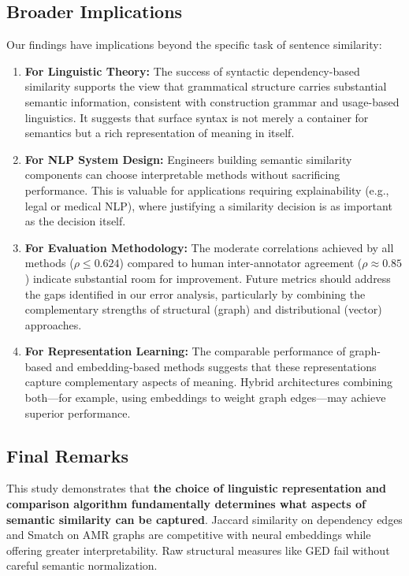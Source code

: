\documentclass[11pt,a4paper]{article}
\begin{document}
\subsection{Broader Implications}

Our findings have implications beyond the specific task of sentence similarity:

\begin{enumerate}
    \item \textbf{For Linguistic Theory:} The success of syntactic dependency-based similarity supports the view that grammatical structure carries substantial semantic information, consistent with construction grammar and usage-based linguistics. It suggests that surface syntax is not merely a container for semantics but a rich representation of meaning in itself.
    
    \item \textbf{For NLP System Design:} Engineers building semantic similarity components can choose interpretable methods without sacrificing performance. This is valuable for applications requiring explainability (e.g., legal or medical NLP), where justifying a similarity decision is as important as the decision itself.
    
    \item \textbf{For Evaluation Methodology:} The moderate correlations achieved by all methods ($\rho \leq 0.624$) compared to human inter-annotator agreement ($\rho \approx 0.85$) indicate substantial room for improvement. Future metrics should address the gaps identified in our error analysis, particularly by combining the complementary strengths of structural (graph) and distributional (vector) approaches.
    
    \item \textbf{For Representation Learning:} The comparable performance of graph-based and embedding-based methods suggests that these representations capture complementary aspects of meaning. Hybrid architectures combining both---for example, using embeddings to weight graph edges---may achieve superior performance.
\end{enumerate}

\subsection{Final Remarks}

This study demonstrates that \textbf{the choice of linguistic representation and comparison algorithm fundamentally determines what aspects of semantic similarity can be captured}. Jaccard similarity on dependency edges and Smatch on AMR graphs are competitive with neural embeddings while offering greater interpretability. Raw structural measures like GED fail without careful semantic normalization.
\end{document}
